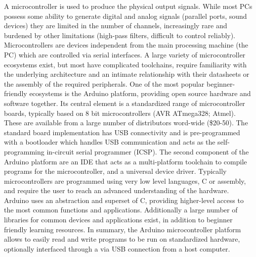 A microcontroller is used to produce the physical output signals. While most PCs possess some ability to generate digital and analog signals (parallel ports, sound devices) they are limited in the number of channels, increasingly rare and burdened by other limitations (high-pass filters, difficult to control reliably). Microcontrollers are devices independent from the main processing machine (the PC) which are controlled via serial interfaces. A large variety of microcontroller ecosystems exist, but most have complicated toolchains, require familiarity with the underlying architecture and an intimate relationship with their datasheets or the assembly of the required peripherals. One of the most popular beginner-friendly ecosystems is the Arduino platform, providing open source hardware and software together. Its central element is a standardized range of microcontroller boards, typically based on 8 bit microcontrollers (AVR ATmega328; Atmel). These are available from a large number of distributors word-wide (\$20-50). The standard board implementation has USB connectivity and is pre-programmed with a bootloader which handles USB communication and acts as the self-programming in-circuit serial programmer (ICSP). The second component of the Arduino platform are an IDE that acts as a multi-platform toolchain to compile programs for the microcontroller, and a universal device driver. Typically microcontrollers are programmed using very low level languages, C or assembly, and require the user to reach an advanced understanding of the hardware. Arduino uses an abstraction and superset of C, providing higher-level access to the most common functions and applications. Additionally a large number of libraries for common devices and applications exist, in addition to beginner friendly learning resources. In summary, the Arduino microcontroller platform allows to easily read and write programs to be run on standardized hardware, optionally interfaced through a via USB connection from a host computer.

\newpage
